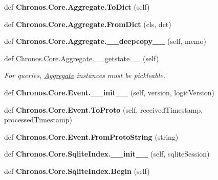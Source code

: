\begin{DoxyCompactItemize}
\item 
def {\bfseries Chronos.\+Core.\+Aggregate.\+To\+Dict} (self)\hypertarget{group__Chronos_ga34c5ea7a68d39abffd9ecabb522d76fd}{}\label{group__Chronos_ga34c5ea7a68d39abffd9ecabb522d76fd}

\item 
def {\bfseries Chronos.\+Core.\+Aggregate.\+From\+Dict} (cls, dct)\hypertarget{group__Chronos_ga33492fbf18a228c681c7a624cd335ada}{}\label{group__Chronos_ga33492fbf18a228c681c7a624cd335ada}

\item 
def {\bfseries Chronos.\+Core.\+Aggregate.\+\_\+\+\_\+deepcopy\+\_\+\+\_\+} (self, memo)\hypertarget{group__Chronos_ga494c5185b7ca19fe89bd28799fbd8db7}{}\label{group__Chronos_ga494c5185b7ca19fe89bd28799fbd8db7}

\item 
def \hyperlink{group__Chronos_gad756f2fc68dddd2ffd3ce45ef50e6820}{Chronos.\+Core.\+Aggregate.\+\_\+\+\_\+getstate\+\_\+\+\_\+} (self)
\begin{DoxyCompactList}\small\item\em For queries, \hyperlink{classChronos_1_1Core_1_1Aggregate}{Aggregate} instances must be pickleable. \end{DoxyCompactList}\item 
def {\bfseries Chronos.\+Core.\+Event.\+\_\+\+\_\+init\+\_\+\+\_\+} (self, version, logic\+Version)\hypertarget{group__Chronos_ga903eb0b0c04b9e2a00a331cffbd68424}{}\label{group__Chronos_ga903eb0b0c04b9e2a00a331cffbd68424}

\item 
def {\bfseries Chronos.\+Core.\+Event.\+To\+Proto} (self, received\+Timestamp, processed\+Timestamp)\hypertarget{group__Chronos_gadbbe6de35497145a52562e94b57517fc}{}\label{group__Chronos_gadbbe6de35497145a52562e94b57517fc}

\item 
def {\bfseries Chronos.\+Core.\+Event.\+From\+Proto\+String} (string)\hypertarget{group__Chronos_gab0efaec62fd66462ea3f2bec75190663}{}\label{group__Chronos_gab0efaec62fd66462ea3f2bec75190663}

\item 
def {\bfseries Chronos.\+Core.\+Sqlite\+Index.\+\_\+\+\_\+init\+\_\+\+\_\+} (self, sqlite\+Session)\hypertarget{group__Chronos_gac0c140404af0721ad1057772354d2323}{}\label{group__Chronos_gac0c140404af0721ad1057772354d2323}

\item 
def {\bfseries Chronos.\+Core.\+Sqlite\+Index.\+Begin} (self)\hypertarget{group__Chronos_ga1e71bd1abea3b852efd806af6b216643}{}\label{group__Chronos_ga1e71bd1abea3b852efd806af6b216643}


\end{DoxyCompactItemize}

